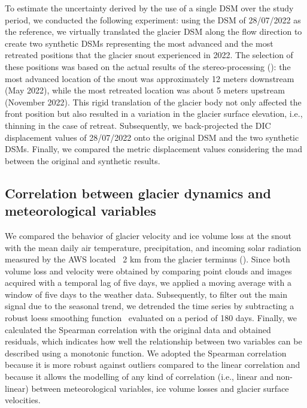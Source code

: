 To estimate the uncertainty derived by the use of a single DSM over the study period, we conducted the following experiment: using the DSM of 28/07/2022 as the reference, we virtually translated the glacier DSM along the flow direction to create two synthetic DSMs representing the most advanced and the most retreated positions that the glacier snout experienced in 2022.
The selection of these positions was based on the actual results of the stereo-processing (): the most advanced location of the snout was
approximately 12 meters downstream (May 2022), while the most retreated location was about 5 meters upstream (November 2022). This rigid translation of the glacier body not only affected the front position but also resulted in a variation in the glacier surface elevation, i.e., thinning in the case of retreat.
Subsequently, we back-projected the DIC displacement values of 28/07/2022 onto the original DSM and the two synthetic DSMs. Finally, we compared the metric displacement
values considering the \ac{mad} between the original and synthetic results.

\subsection{Correlation between glacier dynamics and meteorological variables}
\label{sec:4:meteoanalysis}
We compared the behavior of glacier velocity and ice volume loss at the snout with the mean daily air temperature, precipitation, and incoming solar radiation measured by the AWS located ~2 km from the glacier terminus ().
Since both volume loss and velocity were obtained by comparing point clouds and images acquired with a temporal lag of five days, we applied a moving average with a window of five days to the weather data. Subsequently, to filter out the main signal due to the seasonal trend, we detrended the time series by subtracting a robust loess smoothing function~\citep{Cleveland1979} evaluated on a period of 180 days.
Finally, we calculated the Spearman correlation with the original data and obtained residuals, which indicates how well the relationship between two variables can be
described using a monotonic function.
We adopted the Spearman correlation because it is more robust against outliers compared to the linear correlation and because it allows the modelling of any kind of correlation (i.e., linear and non-linear) between meteorological variables, ice volume losses and glacier surface velocities.


